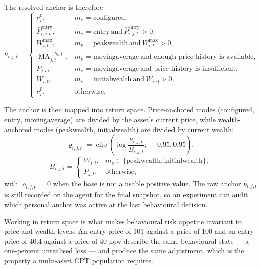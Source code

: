 \documentclass[12pt, a4paper]{article}
\DeclareMathOperator{\clip}{clip}
\DeclareMathOperator{\MA}{MA}
\begin{document}
    The resolved anchor is therefore
    \[
        \nu_{i,j,t}=
        \begin{cases}
            \nu_i^0,
            & m_{\nu}=\mathrm{configured},\\[0.8ex]
            \bar P_{i,j,t}^{\text{entry}},
            & m_{\nu}=\mathrm{entry}\ \text{and}\ \bar P_{i,j,t}^{\text{entry}}>0,\\[0.8ex]
            W_{i,t}^{\max},
            & m_{\nu}=\mathrm{peakwealth}\ \text{and}\ W_{i,t}^{\max}>0,\\[0.8ex]
            \MA_{j,t}^{(h_{\nu})},
            & m_{\nu}=\mathrm{movingaverage}\ \text{and enough price history is available},\\[0.8ex]
            P_{j,t},
            & m_{\nu}=\mathrm{movingaverage}\ \text{and price history is insufficient},\\[0.8ex]
            W_{i,0},
            & m_{\nu}=\mathrm{initialwealth}\ \text{and}\ W_{i,0}>0,\\[0.8ex]
            \nu_i^0,
            & \text{otherwise}.
        \end{cases}
    \]

    The anchor is then mapped into return space. Price-anchored modes
    (\(\mathrm{configured}\), \(\mathrm{entry}\), \(\mathrm{movingaverage}\)) are
    divided by the asset's current price, while wealth-anchored modes
    (\(\mathrm{peakwealth}\), \(\mathrm{initialwealth}\)) are divided by current
    wealth:
    \[
        \varrho_{i,j,t}
        =
        \clip\!\left(
            \log\frac{\nu_{i,j,t}}{B_{i,j,t}};\,-0.95,0.95
        \right),
    \]
    \[
        B_{i,j,t}=
        \begin{cases}
            W_{i,t}, & m_{\nu}\in\{\mathrm{peakwealth},\mathrm{initialwealth}\},\\
            P_{j,t}, & \text{otherwise},
        \end{cases}
    \]
    with \(\varrho_{i,j,t}=0\) when the base is not a usable positive value. The
    raw anchor \(\nu_{i,j,t}\) is still recorded on the agent for the final
    snapshot, so an experiment can audit which personal anchor was active at the
    last behavioural decision.

    Working in return space is what makes behavioural risk appetite invariant to
    price and wealth levels. An entry price of \(101\) against a price of \(100\)
    and an entry price of \(40.4\) against a price of \(40\) now describe the same
    behavioural state --- a one-percent unrealised loss --- and produce the same
    adjustment, which is the property a multi-asset CPT population requires.
\end{document}
